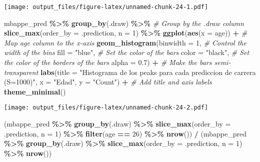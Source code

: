 \documentclass[
]{article}
\newenvironment{Shaded}{\begin{snugshade}}{\end{snugshade}}
\newcommand{\AttributeTok}[1]{\textcolor[rgb]{0.13,0.29,0.53}{#1}}
\newcommand{\CommentTok}[1]{\textcolor[rgb]{0.56,0.35,0.01}{\textit{#1}}}
\newcommand{\DecValTok}[1]{\textcolor[rgb]{0.00,0.00,0.81}{#1}}
\newcommand{\FloatTok}[1]{\textcolor[rgb]{0.00,0.00,0.81}{#1}}
\newcommand{\FunctionTok}[1]{\textcolor[rgb]{0.13,0.29,0.53}{\textbf{#1}}}
\newcommand{\NormalTok}[1]{#1}
\newcommand{\SpecialCharTok}[1]{\textcolor[rgb]{0.81,0.36,0.00}{\textbf{#1}}}
\newcommand{\StringTok}[1]{\textcolor[rgb]{0.31,0.60,0.02}{#1}}
\begin{document}
\texttt{[image: output\_files/figure-latex/unnamed-chunk-24-1.pdf]}

\begin{Shaded}
\begin{Highlighting}[]
\NormalTok{mbappe\_pred }\SpecialCharTok{\%\textgreater{}\%}
  \FunctionTok{group\_by}\NormalTok{(.draw) }\SpecialCharTok{\%\textgreater{}\%}               \CommentTok{\# Group by the .draw column}
  \FunctionTok{slice\_max}\NormalTok{(}\AttributeTok{order\_by =}\NormalTok{ .prediction, }\AttributeTok{n =} \DecValTok{1}\NormalTok{) }\SpecialCharTok{\%\textgreater{}\%}
    \FunctionTok{ggplot}\NormalTok{(}\FunctionTok{aes}\NormalTok{(}\AttributeTok{x =}\NormalTok{ age)) }\SpecialCharTok{+}         \CommentTok{\# Map \textquotesingle{}age\textquotesingle{} column to the x{-}axis}
    \FunctionTok{geom\_histogram}\NormalTok{(}\AttributeTok{binwidth =} \DecValTok{1}\NormalTok{,     }\CommentTok{\# Control the width of the bins}
                 \AttributeTok{fill =} \StringTok{"blue"}\NormalTok{,    }\CommentTok{\# Set the color of the bars}
                 \AttributeTok{color =} \StringTok{"black"}\NormalTok{,  }\CommentTok{\# Set the color of the borders of the bars}
                 \AttributeTok{alpha =} \FloatTok{0.7}\NormalTok{) }\SpecialCharTok{+}    \CommentTok{\# Make the bars semi{-}transparent}
    \FunctionTok{labs}\NormalTok{(}\AttributeTok{title =} \StringTok{"Histograma de los peaks para cada prediccion de carrera (S=1000)"}\NormalTok{, }\AttributeTok{x =} \StringTok{"Edad"}\NormalTok{, }\AttributeTok{y =} \StringTok{"Count"}\NormalTok{) }\SpecialCharTok{+} \CommentTok{\# Add title and axis labels}
    \FunctionTok{theme\_minimal}\NormalTok{()   }
\end{Highlighting}
\end{Shaded}

\texttt{[image: output\_files/figure-latex/unnamed-chunk-24-2.pdf]}

\begin{Shaded}
\begin{Highlighting}[]
\NormalTok{(mbappe\_pred }\SpecialCharTok{\%\textgreater{}\%}
  \FunctionTok{group\_by}\NormalTok{(.draw) }\SpecialCharTok{\%\textgreater{}\%}
  \FunctionTok{slice\_max}\NormalTok{(}\AttributeTok{order\_by =}\NormalTok{ .prediction, }\AttributeTok{n =} \DecValTok{1}\NormalTok{) }\SpecialCharTok{\%\textgreater{}\%}
  \FunctionTok{filter}\NormalTok{(age }\SpecialCharTok{==} \DecValTok{26}\NormalTok{) }\SpecialCharTok{\%\textgreater{}\%}
  \FunctionTok{nrow}\NormalTok{()) }\SpecialCharTok{/} 
\NormalTok{  (mbappe\_pred }\SpecialCharTok{\%\textgreater{}\%}
  \FunctionTok{group\_by}\NormalTok{(.draw) }\SpecialCharTok{\%\textgreater{}\%}
  \FunctionTok{slice\_max}\NormalTok{(}\AttributeTok{order\_by =}\NormalTok{ .prediction, }\AttributeTok{n =} \DecValTok{1}\NormalTok{) }\SpecialCharTok{\%\textgreater{}\%}
  \FunctionTok{nrow}\NormalTok{())}
\end{Highlighting}
\end{Shaded}
\end{document}
